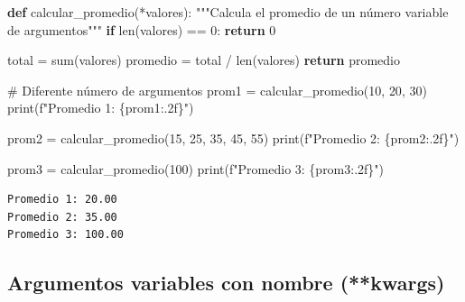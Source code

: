 \documentclass[
  doc,
  floatsintext,
  longtable,
  a4paper,
  nolmodern,
  notxfonts,
  notimes,
  12pt,
  colorlinks=true,linkcolor=blue,citecolor=blue,urlcolor=blue]{apa7}
\newenvironment{Shaded}{\begin{snugshade}}{\end{snugshade}}
\newcommand{\BuiltInTok}[1]{\textcolor[rgb]{0.00,0.23,0.31}{#1}}
\newcommand{\CommentTok}[1]{\textcolor[rgb]{0.37,0.37,0.37}{#1}}
\newcommand{\ControlFlowTok}[1]{\textcolor[rgb]{0.00,0.23,0.31}{\textbf{#1}}}
\newcommand{\DecValTok}[1]{\textcolor[rgb]{0.68,0.00,0.00}{#1}}
\newcommand{\KeywordTok}[1]{\textcolor[rgb]{0.00,0.23,0.31}{\textbf{#1}}}
\newcommand{\NormalTok}[1]{\textcolor[rgb]{0.00,0.23,0.31}{#1}}
\newcommand{\OperatorTok}[1]{\textcolor[rgb]{0.37,0.37,0.37}{#1}}
\newcommand{\SpecialCharTok}[1]{\textcolor[rgb]{0.37,0.37,0.37}{#1}}
\newcommand{\SpecialStringTok}[1]{\textcolor[rgb]{0.13,0.47,0.30}{#1}}
\begin{document}
\begin{Shaded}
\begin{Highlighting}[]
\KeywordTok{def}\NormalTok{ calcular\_promedio(}\OperatorTok{*}\NormalTok{valores):}
    \CommentTok{"""Calcula el promedio de un número variable de argumentos"""}
    \ControlFlowTok{if} \BuiltInTok{len}\NormalTok{(valores) }\OperatorTok{==} \DecValTok{0}\NormalTok{:}
        \ControlFlowTok{return} \DecValTok{0}
    
\NormalTok{    total }\OperatorTok{=} \BuiltInTok{sum}\NormalTok{(valores)}
\NormalTok{    promedio }\OperatorTok{=}\NormalTok{ total }\OperatorTok{/} \BuiltInTok{len}\NormalTok{(valores)}
    \ControlFlowTok{return}\NormalTok{ promedio}

\CommentTok{\# Diferente número de argumentos}
\NormalTok{prom1 }\OperatorTok{=}\NormalTok{ calcular\_promedio(}\DecValTok{10}\NormalTok{, }\DecValTok{20}\NormalTok{, }\DecValTok{30}\NormalTok{)}
\BuiltInTok{print}\NormalTok{(}\SpecialStringTok{f"Promedio 1: }\SpecialCharTok{\{}\NormalTok{prom1}\SpecialCharTok{:.2f\}}\SpecialStringTok{"}\NormalTok{)}

\NormalTok{prom2 }\OperatorTok{=}\NormalTok{ calcular\_promedio(}\DecValTok{15}\NormalTok{, }\DecValTok{25}\NormalTok{, }\DecValTok{35}\NormalTok{, }\DecValTok{45}\NormalTok{, }\DecValTok{55}\NormalTok{)}
\BuiltInTok{print}\NormalTok{(}\SpecialStringTok{f"Promedio 2: }\SpecialCharTok{\{}\NormalTok{prom2}\SpecialCharTok{:.2f\}}\SpecialStringTok{"}\NormalTok{)}

\NormalTok{prom3 }\OperatorTok{=}\NormalTok{ calcular\_promedio(}\DecValTok{100}\NormalTok{)}
\BuiltInTok{print}\NormalTok{(}\SpecialStringTok{f"Promedio 3: }\SpecialCharTok{\{}\NormalTok{prom3}\SpecialCharTok{:.2f\}}\SpecialStringTok{"}\NormalTok{)}
\end{Highlighting}
\end{Shaded}

\begin{verbatim}
Promedio 1: 20.00
Promedio 2: 35.00
Promedio 3: 100.00
\end{verbatim}

\subsection{Argumentos variables con nombre
(**kwargs)}\label{argumentos-variables-con-nombre-kwargs}
\end{document}
